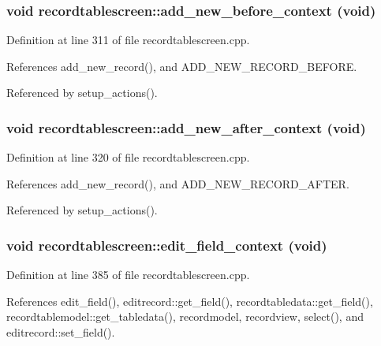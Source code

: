 \subsubsection{\setlength{\rightskip}{0pt plus 5cm}void recordtablescreen::add\_\-new\_\-before\_\-context (void)\hspace{0.3cm}{\tt  [private, slot]}}\label{classrecordtablescreen_ace7ad1829e374ae71e8ca7121fa7607}




Definition at line 311 of file recordtablescreen.cpp.

References add\_\-new\_\-record(), and ADD\_\-NEW\_\-RECORD\_\-BEFORE.

Referenced by setup\_\-actions().
\subsubsection{\setlength{\rightskip}{0pt plus 5cm}void recordtablescreen::add\_\-new\_\-after\_\-context (void)\hspace{0.3cm}{\tt  [private, slot]}}\label{classrecordtablescreen_22360e9ef1ec9a8ae665250a7cbbfb97}




Definition at line 320 of file recordtablescreen.cpp.

References add\_\-new\_\-record(), and ADD\_\-NEW\_\-RECORD\_\-AFTER.

Referenced by setup\_\-actions().
\subsubsection{\setlength{\rightskip}{0pt plus 5cm}void recordtablescreen::edit\_\-field\_\-context (void)\hspace{0.3cm}{\tt  [private, slot]}}\label{classrecordtablescreen_5dd89302e35d464936f4492e8043204c}




Definition at line 385 of file recordtablescreen.cpp.

References edit\_\-field(), editrecord::get\_\-field(), recordtabledata::get\_\-field(), recordtablemodel::get\_\-tabledata(), recordmodel, recordview, select(), and editrecord::set\_\-field().

